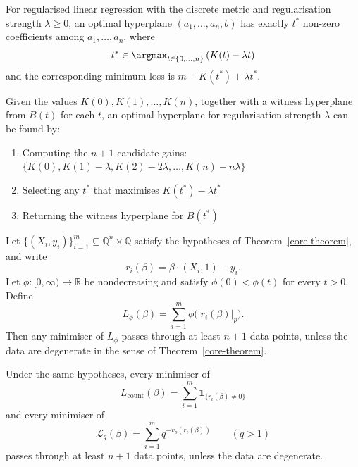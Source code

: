 
\begin{thm}
\label{thm:discrete-regularised}
For regularised linear regression with the discrete metric and regularisation strength $\lambda \geq 0$, an optimal hyperplane $(a_1, \ldots, a_n, b)$ has exactly $t^*$ non-zero coefficients among $a_1, \ldots, a_n$, where
\begin{equation}
    t^* \in \argmax_{t \in \{0, \ldots, n\}} \left( K(t) - \lambda t \right)
\end{equation}
and the corresponding minimum loss is $m - K(t^*) + \lambda t^*$.
\end{thm}

\begin{corollary}
\label{cor:discrete-algorithm}
Given the values $K(0), K(1), \ldots, K(n)$, together with a witness
hyperplane from $B(t)$ for each $t$, an optimal hyperplane for regularisation
strength $\lambda$ can be found by:
\begin{enumerate}
    \item Computing the $n+1$ candidate gains: $\{K(0), K(1)-\lambda, K(2)-2\lambda, \ldots, K(n)-n\lambda\}$
    \item Selecting any $t^*$ that maximises $K(t^*) - \lambda t^*$
    \item Returning the witness hyperplane for $B(t^*)$
\end{enumerate}
\end{corollary}

\begin{thm}
\label{thm:additive-contact}
Let \(\{(X_i,y_i)\}_{i=1}^{m}\subseteq \mathbb{Q}^n\times \mathbb{Q}\) satisfy
the hypotheses of Theorem~\ref{core-theorem}, and write
\[
r_i(\beta)=\beta\cdot (X_i,1)-y_i.
\]
Let \(\phi:[0,\infty)\to\mathbb{R}\) be nondecreasing and satisfy
\(\phi(0)<\phi(t)\) for every \(t>0\). Define
\[
L_{\phi}(\beta)=\sum_{i=1}^{m}\phi\bigl(|r_i(\beta)|_p\bigr).
\]
Then any minimiser of \(L_{\phi}\) passes through at least \(n+1\) data points,
unless the data are degenerate in the sense of Theorem~\ref{core-theorem}.
\end{thm}

\begin{corollary}
\label{cor:additive-contact-special-cases}
Under the same hypotheses, every minimiser of
\[
L_{\mathrm{count}}(\beta)=\sum_{i=1}^{m}\mathbf{1}_{\{r_i(\beta)\neq 0\}}
\]
and every minimiser of
\[
\mathcal{L}_q(\beta)=\sum_{i=1}^{m} q^{-v_p(r_i(\beta))} \qquad (q>1)
\]
passes through at least \(n+1\) data points, unless the data are degenerate.
\end{corollary}

